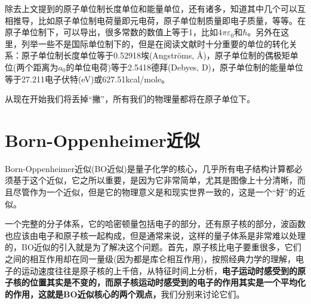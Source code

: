\documentclass[12pt,a4paper,openany,twoside]{book}
\numberwithin{equation}{section}
\begin{document}
    除去上文提到的原子单位制长度单位和能量单位，还有诸多，知道其中几个可以互相推导，比如原子单位制电荷量即元电荷，原子单位制质量即电子质量，等等。在原子单位制下，可以导出，很多常数的数值上等于1，比如$ 4 \pi \varepsilon_0$和$\hbar$。另外在这里，列举一些不是国际单位制下的，但是在阅读文献时十分重要的单位的转化关系：原子单位制长度单位等于0.52918埃(Angstr\"oms, \AA)，原子单位制的偶极矩单位(两个距离为$a_0$的单位电荷)等于2.5418德拜(Debyes, D)，原子单位制的能量单位等于27.211电子伏特(eV)或627.51kcal/mole。

    从现在开始我们将丢掉“撇”，所有我们的物理量都将在原子单位下。
  \section{Born-Oppenheimer近似}
    Born-Oppenheimer近似(BO近似)是量子化学的核心，几乎所有电子结构计算都必须基于这个近似，它之所以重要，是因为它非常简单，尤其是图像上十分清晰，而且尽管作为一个近似，但是它的物理意义是和现实世界一致的，这是一个“好”的近似。

    一个完整的分子体系，它的哈密顿量包括电子的部分，还有原子核的部分，波函数也应该由电子和原子核一起构成，但是通常来说，这样的量子体系是非常难以处理的，BO近似的引入就是为了解决这个问题。首先，原子核比电子要重很多，它们之间的相互作用却在同一量级(因为都是库仑相互作用)，按照经典力学的理解，电子的运动速度往往是原子核的上千倍，从特征时间上分析，\textbf{电子运动时感受到的原子核的位置其实是不变的，而原子核运动时感受到的电子的作用其实是一个平均化的作用，这就是BO近似核心的两个观点，}我们分别来讨论它们。
\end{document}
